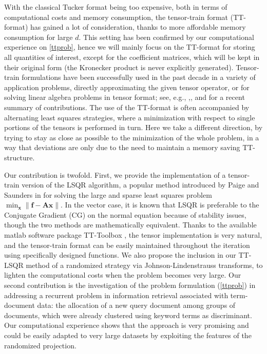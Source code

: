 \documentclass{siamart190516}
\begin{document}
With the classical Tucker format being too expensive, both in terms of computational costs and memory consumption, the tensor-train format (TT-format) has gained a lot of consideration, thanks to more affordable memory consumption for large $d$. This setting has been confirmed by our computational experience on \eqref{ttprob}, hence we will mainly focus on the TT-format for storing all quantities of interest, except for the coefficient matrices, which will be kept in their original form (the 
Kronecker product is never explicitly generated).
Tensor-train formulations have been successfully used in
the past decade in a variety of application problems, 
 directly approximating the given tensor operator, or
 for solving linear algebra problems in tensor format;
 see, e.g., \cite{doi:10.1137/110833142},\cite{doi:10.1137/140953289},
 and
 \cite{Buccietal.24} for a recent
 summary of contributions.
 The use of the TT-format is often
 accompanied by alternating least squares strategies, where
 a minimization with respect to single portions of the
 tensors is performed in turn. Here we take a different
 direction, by trying to stay as close as possible to the
 minimization of the whole problem, in a way that 
 deviations are only due to the need to maintain a memory saving
 TT-structure.

Our contribution is twofold. First, we provide the implementation of a tensor-train version of the LSQR algorithm, a popular method introduced by Paige and Saunders in \cite{paige1982lsqr} for solving the large and sparse least squares problem $\min_{{\bm x}} \|{\bm f}-{\bm A}{\bm x}\|$.
In the vector case, it is known that LSQR is preferable to the Conjugate Gradient (CG) on the normal equation because of stability issues, though the two methods are mathematically equivalent.
Thanks to the available matlab software package
TT-Toolbox \cite{software_tt}, the tensor implementation is very natural, and 
the tensor-train format can be easily maintained
throughout the iteration using specifically designed functions. 
We also propose the inclusion in our TT-LSQR method of a randomized strategy via
Johnson-Lindenstrauss transforms, to lighten the computational
costs when the problem becomes very large.
Our second contribution is the investigation of the problem
formulation (\ref{ttprob}) in addressing a recurrent problem
in information retrieval associated with term-document data:
the allocation of a new query document among
groups of documents, which were
already clustered using keyword terms as discriminant.
Our computational experience shows that the approach is
very promising and could be easily adapted to very large
datasets by exploiting the features of the
randomized projection.
\end{document}
